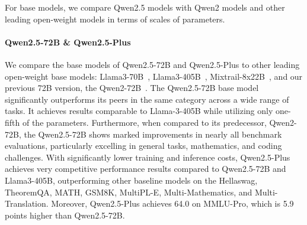 \documentclass{article}
\begin{document}
For base models, we compare Qwen2.5 models with Qwen2 models and other leading open-weight models in terms of scales of parameters.

\paragraph{Qwen2.5-72B \& Qwen2.5-Plus}
We compare the base models of Qwen2.5-72B and Qwen2.5-Plus to other leading open-weight base models: Llama3-70B~\citep{llama3}, Llama3-405B~\citep{llama3}, Mixtrail-8x22B~\citep{mixtral}, and our previous 72B version, the Qwen2-72B~\citep{qwen2}. The Qwen2.5-72B base model significantly outperforms its peers in the same category across a wide range of tasks. It achieves results comparable to Llama-3-405B while utilizing only one-fifth of the parameters. Furthermore, when compared to its predecessor, Qwen2-72B, the Qwen2.5-72B shows marked improvements in nearly all benchmark evaluations, particularly excelling in general tasks, mathematics, and coding challenges. With significantly lower training and inference costs, Qwen2.5-Plus achieves very competitive performance results compared to Qwen2.5-72B and Llama3-405B, outperforming other baseline models on the Hellaswag, TheoremQA, MATH, GSM8K, MultiPL-E, Multi-Mathematics, and Multi-Translation. Moreover, Qwen2.5-Plus achieves 64.0 on MMLU-Pro, which is 5.9 points higher than Qwen2.5-72B.
\end{document}
